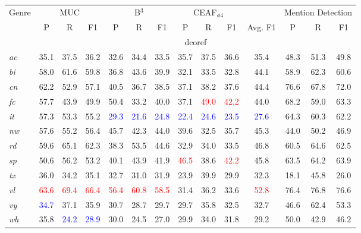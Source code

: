\documentclass[11pt,a4paper]{article}
\begin{document}
\begin{table*}[t!hb]
    \centering\small
    \begin{tabular}{l|cccccccccc|ccc}


    \multirow{2}{*}{Genre} & \multicolumn{3}{c}{MUC} & \multicolumn{3}{c}{B$^3$} & \multicolumn{3}{c}{CEAF$_{\phi4}$} && \multicolumn{3}{c}{Mention Detection} \\
     & P & R & F1 & P & R & F1 & P & R & F1 & Avg. F1 & P & R & F1\\
     \hline\hline
    
& \multicolumn{13}{c}{dcoref}\\\hline
    \textit{ac} & 35.1 & 37.5 & 36.2 & 32.6 & 34.4 & 33.5 & 35.7 & 37.5 & 36.6 & 35.4 & 48.3 & 51.3 & 49.8 \\
    \textit{bi} & 58.0 & 61.6 & 59.8 & 36.8 & 43.6 & 39.9 & 32.1 & 33.5 & 32.8 & 44.1 & 58.9 & 62.3 & 60.6 \\
    \textit{cn} & 62.2 & 52.9 & 57.1 & 40.5 & 36.7 & 38.5 & 37.1 & 38.2 & 37.6 & 44.4 & 76.6 & 67.8 & 72.0\\
    \textit{fc} & 57.7 & 43.9 & 49.9 & 50.4 & 33.2 & 40.0 & 37.1 & \textcolor{red}{49.0} & \textcolor{red}{42.2} & 44.0 & 68.2 & 59.0 & 63.3\\
    \textit{it} & 57.3 & 53.3 & 55.2 & \textcolor{blue}{29.3} & \textcolor{blue}{21.6} & \textcolor{blue}{24.8} & \textcolor{blue}{22.4} & \textcolor{blue}{24.6} & \textcolor{blue}{23.5} & \textcolor{blue}{27.6} & 64.3 & 60.3 & 62.2\\
    \textit{nw} & 57.6 & 55.2 & 56.4 & 45.7 & 42.3 & 44.0 & 39.6 & 32.5 & 35.7 & 45.3 & 44.0 & 50.2 & 46.9 \\
    \textit{rd} & 59.6 & 65.1 & 62.3 & 38.3 & 53.5 & 44.6 & 32.9 & 34.0 & 33.5 & 46.8 & 60.5 & 64.6 & 62.5 \\
    \textit{sp} & 50.6 & 56.2 & 53.2 & 40.1 & 43.9 & 41.9 & \textcolor{red}{46.5} & 38.6 & \textcolor{red}{42.2} & 45.8 & 63.5 & 64.2 & 63.9\\
    \textit{tx} & 36.0 & 34.2 & 35.1 & 32.7 & 31.0 & 31.9 & 23.9 & 39.9 & 29.9 & 32.3 & 18.1 & 45.8 & 26.0 \\
    \textit{vl} & \textcolor{red}{63.6} & \textcolor{red}{69.4} & \textcolor{red}{66.4} & \textcolor{red}{56.4} & \textcolor{red}{60.8} & \textcolor{red}{58.5} & 31.4 & 36.2 & 33.6 & \textcolor{red}{52.8} & 76.4 & 76.8 & 76.6\\
    \textit{vy} & \textcolor{blue}{34.7} & 37.1 & 35.9 & 30.7 & 28.7 & 29.7 & 29.7 & 35.8 & 32.5 & 32.7 & 46.6 & 62.4 & 53.3\\
    \textit{wh} & 35.8 & \textcolor{blue}{24.2} & \textcolor{blue}{28.9} & 30.0 & 24.5 & 27.0 & 29.9 & 34.0 & 31.8 & 29.2 & 50.0 & 42.9 & 46.2\\


\end{tabular}
\end{table*}
\end{document}

